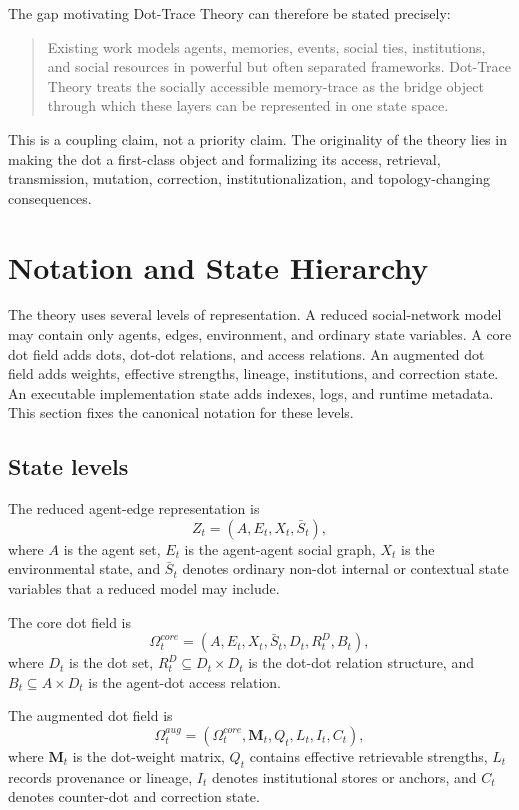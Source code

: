 \documentclass[11pt]{article}
\theoremstyle{remark}
\begin{document}
The gap motivating Dot-Trace Theory can therefore be stated precisely:

\begin{quote}
Existing work models agents, memories, events, social ties, institutions, and social resources in powerful but often separated frameworks. Dot-Trace Theory treats the socially accessible memory-trace as the bridge object through which these layers can be represented in one state space.
\end{quote}

This is a coupling claim, not a priority claim. The originality of the theory lies in making the dot a first-class object and formalizing its access, retrieval, transmission, mutation, correction, institutionalization, and topology-changing consequences.

\section{Notation and State Hierarchy}\label{notation-state-hierarchy}

The theory uses several levels of representation. A reduced social-network model may contain only agents, edges, environment, and ordinary state variables. A core dot field adds dots, dot-dot relations, and access relations. An augmented dot field adds weights, effective strengths, lineage, institutions, and correction state. An executable implementation state adds indexes, logs, and runtime metadata. This section fixes the canonical notation for these levels.

\subsection{State levels}\label{state-levels}

The reduced agent-edge representation is
\[
Z_t=(A,E_t,X_t,\bar S_t),
\]
where $A$ is the agent set, $E_t$ is the agent-agent social graph, $X_t$ is the environmental state, and $\bar S_t$ denotes ordinary non-dot internal or contextual state variables that a reduced model may include.

The core dot field is
\[
\Omega_t^{core}=(A,E_t,X_t,\bar S_t,D_t,R_t^D,B_t),
\]
where $D_t$ is the dot set, $R_t^D\subseteq D_t\times D_t$ is the dot-dot relation structure, and $B_t\subseteq A\times D_t$ is the agent-dot access relation.

The augmented dot field is
\[
\Omega_t^{aug}=(\Omega_t^{core},\mathbf M_t,Q_t,L_t,I_t,C_t),
\]
where $\mathbf M_t$ is the dot-weight matrix, $Q_t$ contains effective retrievable strengths, $L_t$ records provenance or lineage, $I_t$ denotes institutional stores or anchors, and $C_t$ denotes counter-dot and correction state.
\end{document}
